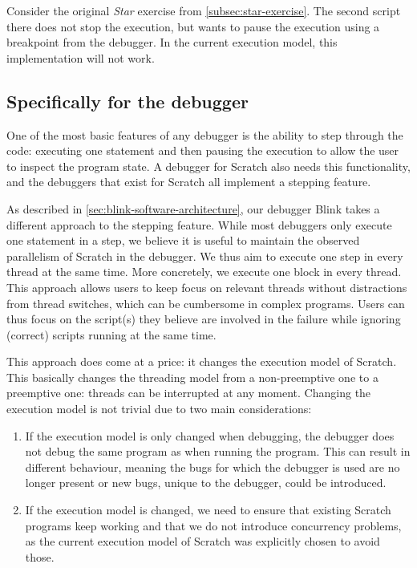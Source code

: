 \documentclass[../main]{subfiles}
\begin{document}
Consider the original \emph{Star} exercise from \cref{subsec:star-exercise}.
The second script there does not stop the execution, but wants to pause the execution using a breakpoint from the debugger.
In the current execution model, this implementation will not work.

\subsection{Specifically for the debugger}\label{subsec:specifically-for-the-debugger}

One of the most basic features of any debugger is the ability to step through the code: executing one statement and then pausing the execution to allow the user to inspect the program state.
A debugger for Scratch also needs this functionality, and the debuggers that exist for Scratch all implement a stepping feature.

As described in \cref{sec:blink-software-architecture}, our debugger Blink takes a different approach to the stepping feature.
While most debuggers only execute one statement in a step, we believe it is useful to maintain the observed parallelism of Scratch in the debugger.
We thus aim to execute one step in every thread at the same time.
More concretely, we execute one block in every thread.
This approach allows users to keep focus on relevant threads without distractions from thread switches, which can be cumbersome in complex programs.
Users can thus focus on the script(s) they believe are involved in the failure while ignoring (correct) scripts running at the same time.

This approach does come at a price: it changes the execution model of Scratch.
This basically changes the threading model from a non-preemptive one to a preemptive one: threads can be interrupted at any moment.
Changing the execution model is not trivial due to two main considerations:

\begin{enumerate}
    \item If the execution model is only changed when debugging, the debugger does not debug the same program as when running the program.
        This can result in different behaviour, meaning the bugs for which the debugger is used are no longer present or new bugs, unique to the debugger, could be introduced.
    \item If the execution model is changed, we need to ensure that existing Scratch programs keep working and that we do not introduce concurrency problems, as the current execution model of Scratch was explicitly chosen to avoid those.
\end{enumerate}
\end{document}
